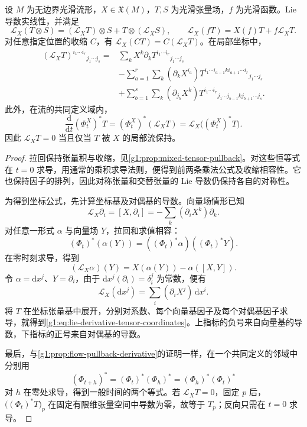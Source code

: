 \begin{proposition}
	\label{g1:prop:lie-derivative-tensor-rules}
	设 \(M\) 为无边界光滑流形，\(X\in\mathfrak X(M)\)，\(T,S\) 为光滑张量场，\(f\) 为光滑函数。Lie 导数实线性，并满足
	\[
		\mathcal L_X(T\otimes S)=(\mathcal L_XT)\otimes S+T\otimes(\mathcal L_XS),\qquad
		\mathcal L_X(fT)=X(f)T+f\mathcal L_XT.
	\]
	对任意指定位置的收缩 \(C\)，有 \(\mathcal L_X(CT)=C(\mathcal L_XT)\)。在局部坐标中，
	\begin{equation}
		\label{g1:eq:lie-derivative-tensor-coordinates}
		\begin{split}
			(\mathcal L_XT)^{i_1\cdots i_r}{}_{j_1\cdots j_s}
			={}&\sum_kX^k\partial_kT^{i_1\cdots i_r}{}_{j_1\cdots j_s}\\
			&-\sum_{a=1}^r\sum_k(\partial_kX^{i_a})
			T^{i_1\cdots i_{a-1}k i_{a+1}\cdots i_r}{}_{j_1\cdots j_s}\\
			&+\sum_{b=1}^s\sum_k(\partial_{j_b}X^k)
			T^{i_1\cdots i_r}{}_{j_1\cdots j_{b-1}k j_{b+1}\cdots j_s}.
		\end{split}
	\end{equation}
	此外，在流的共同定义域内，
	\[
		\frac{\mathrm{d}}{\mathrm{d}t}(\Phi_t^X)^*T
		=(\Phi_t^X)^*(\mathcal L_XT)
		=\mathcal L_X\bigl((\Phi_t^X)^*T\bigr).
	\]
	因此 \(\mathcal L_XT=0\) 当且仅当 \(T\) 被 \(X\) 的局部流保持。
\end{proposition}
\begin{proof}
	拉回保持张量积与收缩，见\cref{g1:prop:mixed-tensor-pullback}。对这些恒等式在 \(t=0\) 求导，用通常的乘积求导法则，便得到前两条乘法公式及收缩相容性。它也保持因子的排列，因此对称张量和交替张量的 Lie 导数仍保持各自的对称性。

	为得到坐标公式，先计算坐标基及对偶基的导数。向量场情形已知
	\[
		\mathcal L_X\partial_i=[X,\partial_i]=-\sum_k(\partial_iX^k)\partial_k.
	\]
	对任意一形式 \(\alpha\) 与向量场 \(Y\)，拉回和求值相容：
	\[
		(\Phi_t)^*(\alpha(Y))=((\Phi_t)^*\alpha)((\Phi_t)^*Y).
	\]
	在零时刻求导，得到
	\begin{equation}
		\label{g1:eq:lie-one-form-evaluation}
		(\mathcal L_X\alpha)(Y)=X(\alpha(Y))-\alpha([X,Y]).
	\end{equation}
	令 \(\alpha=\mathrm{d}x^j\)、\(Y=\partial_i\)，由于 \(\mathrm{d}x^j(\partial_i)=\delta_i^j\) 为常数，便有
	\[
		\mathcal L_X(\mathrm{d}x^j)=\sum_i(\partial_iX^j)\,\mathrm{d}x^i.
	\]
	将 \(T\) 在坐标张量基中展开，分别对系数、每个向量基因子及每个对偶基因子求导，就得到\eqref{g1:eq:lie-derivative-tensor-coordinates}。上指标的负号来自向量基的导数，下指标的正号来自对偶基的导数。

	最后，与\cref{g1:prop:flow-pullback-derivative}的证明一样，在一个共同定义的邻域中分别用
	\[
		(\Phi_{t+h})^*=(\Phi_t)^*(\Phi_h)^*
		=(\Phi_h)^*(\Phi_t)^*
	\]
	对 \(h\) 在零处求导，得到一般时间的两个等式。若 \(\mathcal L_XT=0\)，固定 \(p\) 后，\(\bigl((\Phi_t)^*T\bigr)_p\) 在固定有限维张量空间中导数为零，故等于 \(T_p\)；反向只需在 \(t=0\) 求导。
\end{proof}

